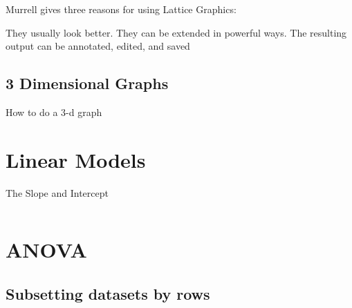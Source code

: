 Murrell gives three reasons for using Lattice Graphics:

They usually look better.
They can be extended in powerful ways.
The resulting output can be annotated, edited, and saved

\subsection{3 Dimensional Graphs}
How to do a 3-d graph

\newpage

\section{Linear Models}

The Slope and Intercept
\begin{framed}
\begin{verbatim}

\end{verbatim}
\end{framed}

\section{ANOVA}


\newpage





\subsection{Subsetting datasets by rows}

